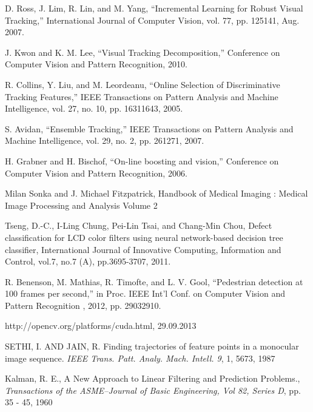 \begin{thebibliography}{SMAT}
D. Ross, J. Lim, R. Lin, and M. Yang, \textquotedblleft{}Incremental Learning for Robust Visual Tracking,\textquotedblright{} International Journal of Computer Vision, vol. 77, pp. 125\textendash{}141, Aug. 2007.

J. Kwon and K. M. Lee, \textquotedblleft{}Visual Tracking Decomposition,\textquotedblright{} Conference on Computer Vision and Pattern Recognition, 2010.

R. Collins, Y. Liu, and M. Leordeanu, \textquotedblleft{}Online Selection of Discriminative Tracking Features,\textquotedblright{} IEEE Transactions on Pattern Analysis and Machine Intelligence, vol. 27, no. 10, pp. 1631\textendash{}1643, 2005.

S. Avidan, \textquotedblleft{}Ensemble Tracking,\textquotedblright{} IEEE Transactions on Pattern Analysis and Machine Intelligence, vol. 29, no. 2, pp. 261\textendash{}271, 2007.

H. Grabner and H. Bischof, \textquotedblleft{}On-line boosting and vision,\textquotedblright{} Conference on Computer Vision and Pattern Recognition, 2006.

Milan Sonka and J. Michael Fitzpatrick, Handbook of Medical Imaging : Medical Image Processing and Analysis Volume 2

Tseng, D.-C., I-Ling Chung, Pei-Lin Tsai, and Chang-Min Chou, \textquotedbl{}Defect classification for LCD color filters using neural network-based decision tree classifier,\textquotedbl{} International Journal of Innovative Computing, Information and Control, vol.7, no.7 (A), pp.3695-3707, 2011.

R. Benenson, M. Mathias, R. Timofte, and L. V. Gool, \textquotedblleft{}Pedestrian detection at 100 frames per second,\textquotedblright{} in Proc. IEEE Int\textquoteright{}l Conf. on Computer Vision and Pattern Recognition , 2012, pp. 2903\textendash{}2910.

http://opencv.org/platforms/cuda.html, 29.09.2013

SETHI, I. AND JAIN, R. Finding trajectories of feature points in a monocular image sequence. \textit{IEEE Trans. Patt. Analy. Mach. Intell. 9}, 1, 56\textendash{}73, 1987

Kalman, R. E., A New Approach to Linear Filtering and Prediction Problems., \textit{Transactions of the ASME--Journal of Basic Engineering, Vol 82, Series D}, pp. 35 - 45, 1960 


\end{thebibliography}
